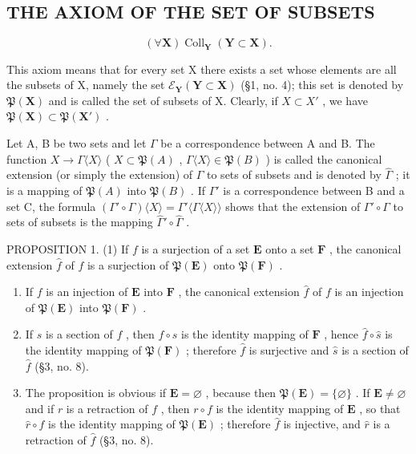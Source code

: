 \subsection{THE AXIOM OF THE SET OF SUBSETS}

\[
(\forall \mathbf {X}) \operatorname{Coll} _ {\mathbf {Y}} (\mathbf {Y} \subset \mathbf {X}).
\]

This axiom means that for every set X there exists a set whose elements are all the subsets of X, namely the set \(\mathcal{E}_{\mathbf{Y}}(\mathbf{Y}\subset\mathbf{X})\) (§1, no. 4); this set is denoted by \(\mathfrak{P}(\mathbf{X})\) and is called the set of subsets of X. Clearly, if \(X\subset X'\) , we have \(\mathfrak{P}(\mathbf{X})\subset\mathfrak{P}(\mathbf{X}')\) .

Let A, B be two sets and let \(\Gamma\) be a correspondence between A and B. The function \(X \to \Gamma\langle X\rangle\) ( \(X \subset \mathfrak{P}(A)\) , \(\Gamma\langle X\rangle \in \mathfrak{P}(B)\) ) is called the canonical extension (or simply the extension) of \(\Gamma\) to sets of subsets and is denoted by \(\hat{\Gamma}\) ; it is a mapping of \(\mathfrak{P}(A)\) into \(\mathfrak{P}(B)\) . If \(\Gamma'\) is a correspondence between B and a set C, the formula \((\Gamma' \circ \Gamma)\langle X\rangle = \Gamma'\langle\Gamma\langle X\rangle\rangle\) shows that the extension of \(\Gamma' \circ \Gamma\) to sets of subsets is the mapping \(\hat{\Gamma}' \circ \hat{\Gamma}\) .

PROPOSITION 1. (1) If \(f\) is a surjection of a set \(\mathbf{E}\) onto a set \(\mathbf{F}\) , the canonical extension \(\hat{f}\) of \(f\) is a surjection of \(\mathfrak{P}(\mathbf{E})\) onto \(\mathfrak{P}(\mathbf{F})\) .

\begin{enumerate}
\def\labelenumi{(\arabic{enumi})}
\setcounter{enumi}{1}
\item
  If \(f\) is an injection of \(\mathbf{E}\) into \(\mathbf{F}\) , the canonical extension \(\hat{f}\) of \(f\) is an injection of \(\mathfrak{P}(\mathbf{E})\) into \(\mathfrak{P}(\mathbf{F})\) .
\item
  If \(s\) is a section of \(f\) , then \(f \circ s\) is the identity mapping of \(\mathbf{F}\) , hence \(\hat{f} \circ \hat{s}\) is the identity mapping of \(\mathfrak{P}(\mathbf{F})\) ; therefore \(\hat{f}\) is surjective and \(\hat{s}\) is a section of \(\hat{f}\) (§3, no. 8).
\item
  The proposition is obvious if \(\mathbf{E} = \varnothing\) , because then \(\mathfrak{P}(\mathbf{E}) = \{\varnothing\}\) . If \(\mathbf{E} \neq \varnothing\) and if \(r\) is a retraction of \(f\) , then \(r \circ f\) is the identity mapping of \(\mathbf{E}\) , so that \(\hat{r} \circ \hat{f}\) is the identity mapping of \(\mathfrak{P}(\mathbf{E})\) ; therefore \(\hat{f}\) is injective, and \(\hat{r}\) is a retraction of \(\hat{f}\) (§3, no. 8).
\end{enumerate}

